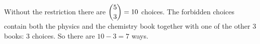 Without the restriction there are $\dbinom53=10$ choices. The forbidden choices contain both the physics and the chemistry book together with one of the other $3$ books: $3$ choices. So there are $10-3=\boxed{7}$ ways.
